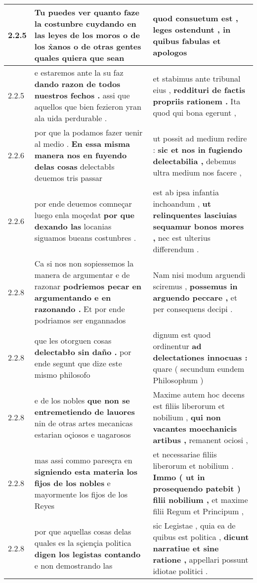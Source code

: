 \begin{tabular}{|p{1cm}|p{6.5cm}|p{6.5cm}|}
2.2.5 & Tu puedes ver \textbf{ quanto faze la costunbre cuydando en las leyes de los moros o de los x̉anos o de otras gentes } quales quiera que sean & quod consuetum est , \textbf{ leges ostendunt , } in quibus fabulas et apologos \\\hline
2.2.5 & e estaremos ante la su faz \textbf{ dando razon de todos nuestros fechos . } assi que aquellos que bien fezieron yran ala uida perdurable . & et stabimus ante tribunal eius , \textbf{ reddituri de factis propriis rationem . } Ita quod qui bona egerunt , \\\hline
2.2.6 & por que la podamos fazer uenir al medio . \textbf{ En essa misma manera nos en fuyendo delas cosas } delectabłs deuemos tris passar & ut possit ad medium redire : \textbf{ sic et nos in fugiendo delectabilia , } debemus ultra medium nos facere , \\\hline
2.2.6 & por ende deuemos comneçar luego enla moçedat \textbf{ por que dexando las } locanias siguamos bueans costunbres . & est ab ipsa infantia inchoandum , \textbf{ ut relinquentes lasciuias sequamur bonos mores , } nec est ulterius differendum . \\\hline
2.2.8 & Ca si nos non sopiessemos la manera de argumentar e de razonar \textbf{ podriemos pecar en argumentando e en razonando . } Et por ende podriamos ser engannados & Nam nisi modum arguendi sciremus , \textbf{ possemus in arguendo peccare , } et per consequens decipi . \\\hline
2.2.8 & que les otorguen cosas \textbf{ delectabło sin daño . } por ende segunt que dize este mismo philosofo & dignum est quod ordinentur \textbf{ ad delectationes innocuas : } quare ( secundum eundem Philosophum ) \\\hline
2.2.8 & e de los nobles \textbf{ que non se entremetiendo de lauores } nin de otras artes mecanicas estarian oçiosos e uagarosos & Maxime autem hoc decens est filiis liberorum et nobilium , \textbf{ qui non vacantes moechanicis artibus , } remanent ociosi , \\\hline
2.2.8 & mas assi commo paresçra en \textbf{ signiendo esta materia los fijos de los nobles } e mayormente los fijos de los Reyes & et necessariae filiis liberorum et nobilium . \textbf{ Immo ( ut in prosequendo patebit ) filii nobilium , } et maxime filii Regum et Principum , \\\hline
2.2.8 & por que aquellas cosas delas quales es la sçiençia politica \textbf{ digen los legistas contando } e non demostrando las & sic Legistae , quia ea de quibus est politica , \textbf{ dicunt narratiue et sine ratione , } appellari possunt idiotae politici . \\\hline

\end{tabular}
